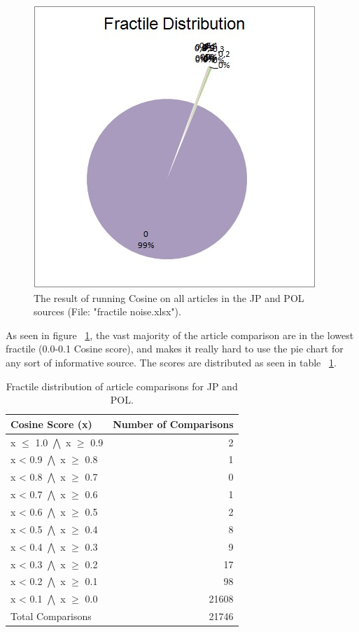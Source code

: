 \begin{figure}
	\centering
	\includegraphics[scale=1.0]{figures/FractileNoise}
	\caption{The result of running Cosine on all articles in the JP and POL sources (File: "fractile noise.xlsx").}
	\label{FractileNoise}
\end{figure}

As seen in figure ~\ref{FractileNoise}, the vast majority of the article comparison are in the lowest fractile (0.0-0.1 Cosine score), and makes it really hard to use the pie chart for any sort of informative source. The scores are distributed as seen in table ~\ref{TestFractile}.

\begin{table}
\begin{center}
	\begin{tabular}{l | r}
		Cosine Score (x) & Number of Comparisons\\ \hline
		x $\leq$ 1.0 $\bigwedge$ x $\geq$ 0.9 & 2 \\ \hline
		x < 0.9 $\bigwedge$ x $\geq$ 0.8 & 1 \\ \hline
		x < 0.8 $\bigwedge$ x $\geq$ 0.7 & 0 \\ \hline
		x < 0.7 $\bigwedge$ x $\geq$ 0.6 & 1 \\ \hline
		x < 0.6 $\bigwedge$ x $\geq$ 0.5 & 2 \\ \hline
		x < 0.5 $\bigwedge$ x $\geq$ 0.4 & 8 \\ \hline
		x < 0.4 $\bigwedge$ x $\geq$ 0.3 & 9 \\ \hline
		x < 0.3 $\bigwedge$ x $\geq$ 0.2 & 17 \\ \hline
		x < 0.2 $\bigwedge$ x $\geq$ 0.1 & 98 \\ \hline
		x < 0.1 $\bigwedge$ x $\geq$ 0.0 & 21608 \\ \hline	
		Total Comparisons & 21746 \\ \hline
	\end{tabular}
\end{center}
\caption{Fractile distribution of article comparisons for JP and POL.}\label{TestFractile}
\end{table}

